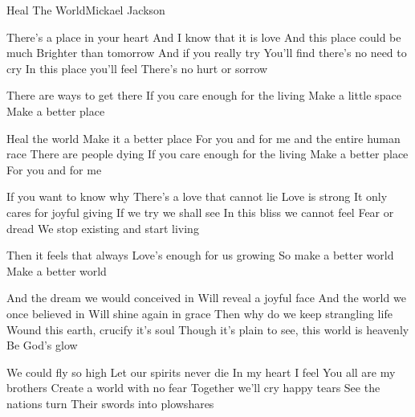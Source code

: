 \begin{Song}{Heal The World}{Mickael Jackson}
\begin{multicols}{2}
\begin{Verse}
There's a place in your heart
And I know that it is love
And this place could be much
Brighter than tomorrow
And if you really try
You'll find there's no need to cry
In this place you'll feel
There's no hurt or sorrow
\end{Verse}
\espaceInterStrophe

\begin{PreChorus}
There are ways to get there
If you care enough for the living
Make a little space
Make a better place
\end{PreChorus}
\espaceInterStrophe

\begin{Chorus}
Heal the world
Make it a better place
For you and for me and the entire human race
There are people dying
If you care enough for the living
Make a better place
For you and for me
\end{Chorus}
\espaceInterStrophe

\begin{Verse}
If you want to know why
There's a love that cannot lie
Love is strong
It only cares for joyful giving
If we try we shall see
In this bliss we cannot feel
Fear or dread
We stop existing and start living
\end{Verse}
\espaceInterStrophe

\begin{PreChorus}
Then it feels that always
Love's enough for us growing
So make a better world
Make a better world
\end{PreChorus}
\espaceInterStrophe

\tochorus
\vfill
\columnbreak

\begin{Bridge}
And the dream we would conceived in
Will reveal a joyful face
And the world we once believed in
Will shine again in grace
Then why do we keep strangling life
Wound this earth, crucify it's soul
Though it's plain to see, this world is heavenly
Be God's glow
\end{Bridge}
\espaceInterStrophe

\begin{Verse}
We could fly so high
Let our spirits never die
In my heart I feel
You all are my brothers
Create a world with no fear
Together we'll cry happy tears
See the nations turn
Their swords into plowshares
\end{Verse}
\espaceInterStrophe


\end{multicols}
\end{Song}
